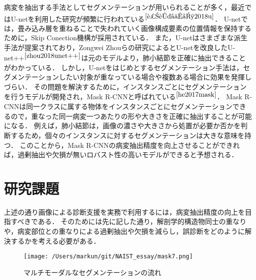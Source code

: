 \documentclass[a4j,10pt,twocolumn]{jarticle}
\begin{document}
病変を抽出する手法としてセグメンテーションが用いられることが多く，最近ではU-netを利用した研究が頻繁に行われている{$^{\cite{近藤堅司2018u}}$}．
U-netでは，畳み込み層を重ねることで失われていく画像構成要素の位置情報を保持するために，Skip Conection機構が採用されている．
また，U-netはさまざまな派生手法が提案されており，Zongwei Zhouらの研究によるとU-netを改良したU-net++{$^{\cite{zhou2018unet++}}$}は元のモデルより，肺小結節を正確に抽出できることがわかっている．
しかし，U-netをはじめとするセグメンテーション手法は，セグメンテーションしたい対象が重なっている場合や複数ある場合に効果を発揮しづらい．
その問題を解決するために，インスタンスごとにセグメンテーションを行うモデルが開発され，Mask R-CNNと呼ばれている{$^{\cite{he2017mask}}$}．
Mask R-CNNは同一クラスに属する物体をインスタンスごとにセグメンテーションできるので，重なった同一病変一つあたりの形や大きさを正確に抽出することが可能になる．
例えば，肺小結節は，画像の濃さや大きさから処置が必要か否かを判断するため，個々のインスタンスに対するセグメンテーションは大きな意味を持つ．
このことから，Mask R-CNNの病変抽出精度を向上させることができれば，過剰抽出や欠損が無いロバスト性の高いモデルができると予想される．

\section{研究課題}
上述の通り画像による診断支援を実務で利用するには，病変抽出精度の向上を目指すべきである．
そのためには先に記した通り，解剖学的構造物同士の重なりや，病変部位との重なりによる過剰抽出や欠損を減らし，誤診断をどのように解決するかを考える必要がある．

\begin{figure}[ht]%
    \texttt{[image: /Users/markun/git/NAIST\_essay/mask7.png]}
    \caption{マルチモーダルなセグメンテーションの流れ}
\end{figure}
\end{document}
